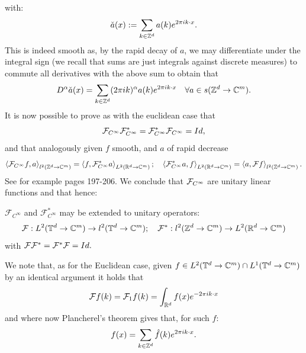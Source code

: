 \documentclass[
    a4paper,
    DIV=14,
    abstract=true,
    numbers=noenddot
]{scrartcl}
\begin{document}
with:
\[\check{a}(x):=\sum_{k\in\mathbb{Z}^d}a(k)e^{2\pi ik\cdot x}.\]
This is indeed smooth as, by the rapid decay of $a$, we may  differentiate under the integral sign  (we recall that sums are just integrals against discrete measures) to commute all derivatives with the above sum to obtain that
\begin{equation}\label{dgivesrpft}
	D^\alpha \check{a}(x)=\sum_{k\in\mathbb{Z}^d}(2\pi ik)^\alpha a(k)e^{2\pi ik\cdot x}\quad\forall{a}\in {s(\mathbb{Z}^d\to\mathbb{C}^m)}.
\end{equation}
It is now possible to prove as with the euclidean case that
\[\mathcal{F}_{C^\infty}\mathcal{F}^*_{C^\infty}=\mathcal{F}^*_{C^\infty}\mathcal{F}_{C^\infty}=Id,\]
and that analogously given $f$ smooth, and $a$ of rapid decrease
\[\left\langle\mathcal{F}_{C^\infty} f,a\right\rangle_{l^2(\mathbb{Z}^d\to\mathbb{C}^m)}=\left\langle f,\mathcal{F}_{C^\infty}^*a\right\rangle_{L^2(\mathbb{R}^d\to\mathbb{C}^m)};\quad\left\langle\mathcal{F}_{C^\infty}^* a,f\right\rangle_{L^2(\mathbb{R}^d\to\mathbb{C}^m)}=\left\langle a,\mathcal{F} f\right\rangle_{l^2(\mathbb{Z}^d\to\mathbb{C}^m)}.\]
See for example \cite{Tay} pages 197-206. We conclude that $\mathcal{F}_{C^\infty}$ are unitary linear functions and that hence:
\begin{proposition} \label{Plancherelperiodictheorem}
	$\mathcal{F}_{C^\infty}$ and $\mathcal{F}_{C^\infty}^*$ may be extended to unitary operators:
	\[\mathcal{F}:L^2(\mathbb{T}^d\to\mathbb{C}^m)\to l^2(\mathbb{T}^d\to\mathbb{C}^m);\quad \mathcal{F}^*:l^2(\mathbb{Z}^d\to\mathbb{C}^m)\to L^2(\mathbb{R}^d\to\mathbb{C}^m)\]
	with $\mathcal{F}\mathcal{F}^*=\mathcal{F}^*\mathcal{F}=Id.$
\end{proposition}
We note that, as for the Euclidean case, given $f\in L^2(\mathbb{T}^d\to\mathbb{C}^m)\cap L^1(\mathbb{T}^d\to\mathbb{C}^m)$ by an identical argument it holds that
\[\mathcal{F} f(k)=\mathcal{F}_1f(k)=\int_{\mathbb{R}^d}f(x)e^{-2\pi ik\cdot x}\]
and where now Plancherel's theorem gives that, for such $f$:
\begin{equation}\label{Plancerelpft}
	f(x)=\sum_{k\in\mathbb{Z}^d}\hat{f}(k)e^{2\pi ik\cdot x}.
\end{equation}
\end{document}
